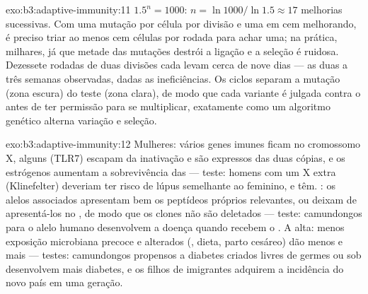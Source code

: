\begin{solution}{exo:b3:adaptive-immunity:11}
$1.5^{n} = 1000$: $n = \ln 1000/\ln 1.5 \approx 17$ melhorias
sucessivas. Com uma mutação por célula por divisão e uma em cem
melhorando, é preciso triar ao menos cem células por rodada para achar
uma; na prática, milhares, já que metade das mutações destrói a ligação
e a seleção é ruidosa. Dezessete rodadas de duas divisões cada levam
cerca de nove dias --- as duas a três semanas observadas, dadas as
ineficiências. Os ciclos separam a mutação (zona escura) do teste (zona
clara), de modo que cada variante é julgada contra o  antes de
ter permissão para se multiplicar, exatamente como um algoritmo
genético alterna variação e seleção.
\end{solution}

\begin{solution}{exo:b3:adaptive-immunity:12}
Mulheres: vários genes imunes ficam no cromossomo X, alguns (TLR7)
escapam da inativação e são expressos das duas cópias, e os estrógenos
aumentam a sobrevivência das  --- teste: homens com um X extra
(Klinefelter) deveriam ter risco de lúpus semelhante ao feminino, e têm.
: os alelos associados apresentam bem os peptídeos próprios
relevantes, ou deixam de apresentá-los no , de modo que os clones
não são deletados --- teste: camundongos  para o alelo
humano desenvolvem a doença quando recebem o . A alta: menos
exposição microbiana precoce e  alterados (,
dieta, parto cesáreo) dão menos  e mais
 --- testes: camundongos propensos a diabetes criados livres
de germes ou sob  desenvolvem mais diabetes, e os filhos de
imigrantes adquirem a incidência do novo país em uma geração.
\end{solution}

